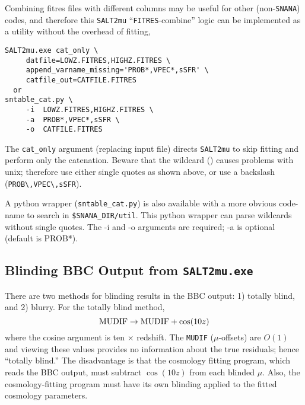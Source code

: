\documentclass[12pt]{article}
\newcommand{\snana}{{\tt SNANA}}
\begin{document}
\medskip
Combining fitres files with different columns may be useful
for other (non-\snana) codes, and therefore this {\tt SALT2mu}
``{\tt FITRES}-combine'' logic can be implemented as a 
utility without the overhead of fitting,
\begin{verbatim}
SALT2mu.exe cat_only \
     datfile=LOWZ.FITRES,HIGHZ.FITRES \
     append_varname_missing='PROB*,VPEC*,sSFR' \
     catfile_out=CATFILE.FITRES
  or
sntable_cat.py \
     -i  LOWZ.FITRES,HIGHZ.FITRES \
     -a  PROB*,VPEC*,sSFR \
     -o  CATFILE.FITRES 
\end{verbatim}
%
The {\tt cat\_only} argument (replacing input file)
directs {\tt SALT2mu} to skip fitting and perform only the catenation.
Beware that the wildcard ({\tt *}) causes problems with unix;
therefore use either single quotes as shown above,
or use a backslash ({\tt PROB\textbackslash*,VPEC\textbackslash*,sSFR}).

A python wrapper ({\tt sntable\_cat.py}) is also available with a 
more obvious code-name to search in {\tt \$SNANA\_DIR/util}.
This python wrapper can parse wildcards without single quotes.
The -i and -o arguments are required; -a is optional (default is PROB*).

  \clearpage
  \subsection{Blinding BBC Output from {\tt SALT2mu.exe} }
  \label{sec:BBC_blind}

There are two methods for blinding results in the BBC output:
1) totally blind, and 2) blurry.
For the totally blind method,
\begin{equation}  
   {\rm MUDIF} \to {\rm MUDIF} + \cos(10z)
\end{equation}
where the cosine argument is ten $\times$ redshift.
The {\tt MUDIF} ($\mu$-offsets) are $O(1)$ and viewing these
values provides no information about the true residuals; 
hence ``totally blind.''
The disadvantage is that the cosmology fitting program, 
which reads the BBC output, 
must subtract $\cos(10z)$ from each blinded $\mu$.
Also, the cosmology-fitting program must have its own
blinding applied to the fitted cosmology parameters.
\end{document}
